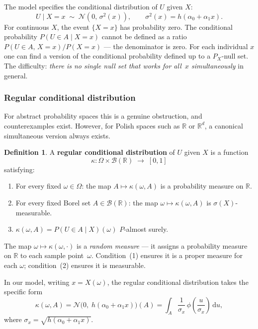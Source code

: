 \documentclass[a4paper,oneside,12pt]{extarticle}
\theoremstyle{plain}
\theoremstyle{definition}
\newtheorem{definition}[proposition]{Definition}
\theoremstyle{remark}
\begin{document}
The model specifies the conditional distribution of $U$ given $X$:
\[
  U \mid X = x \;\sim\; \mathcal{N}(0,\,\sigma^2(x)),
  \qquad \sigma^2(x) = h(\alpha_0 + \alpha_1 x).
\]
For continuous $X$, the event $\{X = x\}$ has probability zero.
The conditional probability $P(U \in A \mid X = x)$ cannot be
defined as a ratio $P(U \in A,\, X = x)/P(X = x)$ — the denominator
is zero.  For each individual $x$ one can find a version of the
conditional probability defined up to a $P_X$-null set.  The
difficulty: \emph{there is no single null set that works for
all~$x$ simultaneously} in general.

\subsubsection*{Regular conditional distribution}

For abstract probability spaces this is a genuine obstruction, and
counterexamples exist.  However, for Polish spaces such as
$\mathbb{R}$ or $\mathbb{R}^d$, a canonical simultaneous version
always exists.

\begin{definition}
A \textbf{regular conditional distribution} of $U$ given $X$ is a
function
\[
  \kappa : \Omega \times \mathcal{B}(\mathbb{R}) \;\longrightarrow\; [0,1]
\]
satisfying:
\begin{enumerate}
\item For every fixed $\omega \in \Omega$: the map $A \mapsto
  \kappa(\omega, A)$ is a probability measure on $\mathbb{R}$.
\item For every fixed Borel set $A \in \mathcal{B}(\mathbb{R})$:
  the map $\omega \mapsto \kappa(\omega, A)$ is
  $\sigma(X)$-measurable.
\item $\kappa(\omega, A) = P(U \in A \mid X)(\omega)$ \quad
  $P$-almost surely.
\end{enumerate}
\end{definition}

The map $\omega \mapsto \kappa(\omega, \cdot)$ is a \emph{random
measure} — it assigns a probability measure on $\mathbb{R}$ to
each sample point~$\omega$.  Condition~(1) ensures it is a proper
measure for each $\omega$; condition~(2) ensures it is measurable.

In our model, writing $x = X(\omega)$, the regular conditional
distribution takes the specific form
\[
  \kappa(\omega, A)
  = \mathcal{N}\!\bigl(0,\; h(\alpha_0 + \alpha_1 x)\bigr)(A)
  = \int_A \frac{1}{\sigma_x}\,\phi\!\left(\frac{u}{\sigma_x}\right)\,\mathrm{d}u,
\]
where $\sigma_x = \sqrt{h(\alpha_0 + \alpha_1 x)}$.
\end{document}
